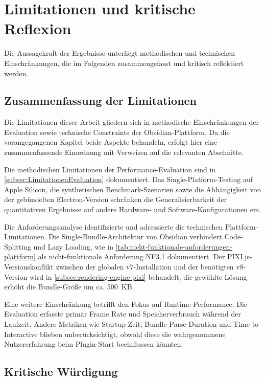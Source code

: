 \section{Limitationen und kritische Reflexion}
\label{sec:Limitationen}

Die Aussagekraft der Ergebnisse unterliegt methodischen und technischen Einschränkungen, die im Folgenden zusammengefasst und kritisch reflektiert werden.

\subsection{Zusammenfassung der Limitationen}
\label{subsec:ZusammenfassungLimitationen}

Die Limitationen dieser Arbeit gliedern sich in methodische Einschränkungen der Evaluation sowie technische Constraints der Obsidian-Plattform. Da die vorangegangenen Kapitel beide Aspekte behandeln, erfolgt hier eine zusammenfassende Einordnung mit Verweisen auf die relevanten Abschnitte.

Die methodischen Limitationen der Performance-Evaluation sind in \autoref{subsec:LimitationenEvaluation} dokumentiert. Das Single-Platform-Testing auf Apple Silicon, die synthetischen Benchmark-Szenarien sowie die Abhängigkeit von der gebündelten Electron-Version schränken die Generalisierbarkeit der quantitativen Ergebnisse auf andere Hardware- und Software-Konfigurationen ein.

Die Anforderungsanalyse identifizierte und adressierte die technischen Plattform-Limitationen. Die Single-Bundle-Architektur von Obsidian verhindert Code-Splitting und Lazy Loading, wie in \autoref{tab:nicht-funktionale-anforderungen-plattform} als nicht-funktionale Anforderung NF3.1 dokumentiert. Der PIXI.js-Versionskonflikt zwischen der globalen v7-Installation und der benötigten v8-Version wird in \autoref{subsec:rendering-engine-pixi} behandelt; die gewählte Lösung erhöht die Bundle-Größe um ca. 500~\ac{KB}.

Eine weitere Einschränkung betrifft den Fokus auf Runtime-Performance. Die Evaluation erfasste primär Frame Rate und Speicherverbrauch während der Laufzeit. Andere Metriken wie Startup-Zeit, Bundle-Parse-Duration und Time-to-Interactive blieben unberücksichtigt, obwohl diese die wahrgenommene Nutzererfahrung beim Plugin-Start beeinflussen könnten.

\subsection{Kritische Würdigung}
\label{subsec:KritischeWuerdigung}

